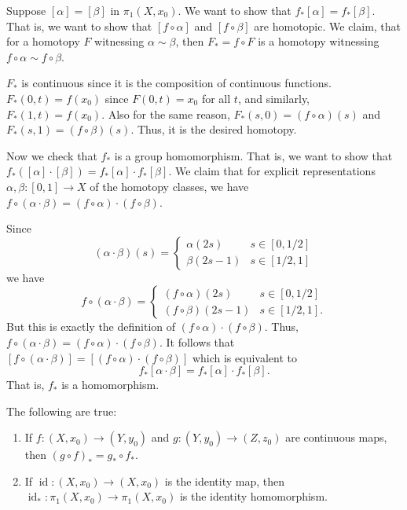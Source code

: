 \documentclass[12 pt, letterpaper]{hmcpset}
\begin{document}
\begin{solution}
	Suppose $[\alpha] = [\beta]$ in $\pi_{1}(X, x_{0})$. We want to show that $f_{*}[\alpha] = f_{*}[\beta]$. That is, we want to show that $[f \circ \alpha]$ and $[f \circ \beta]$ are homotopic. We claim, that for a homotopy $F$ witnessing $\alpha \sim \beta$, then $F_{*} = f \circ F$ is a homotopy witnessing $f \circ \alpha \sim f \circ \beta$.

	$F_{*}$ is continuous since it is the composition of continuous functions. $F_{*}(0, t) = f(x_{0})$ since $F(0, t) = x_{0}$ for all $t$, and similarly, $F_{*}(1, t) = f(x_{0})$. Also for the same reason, $F_{*}(s, 0) = (f \circ \alpha)(s)$ and $F_{*}(s, 1) = (f \circ \beta)(s)$. Thus, it is the desired homotopy.

	Now we check that $f_{*}$ is a group homomorphism. That is, we want to show that $f_{*}([\alpha] \cdot [\beta]) = f_{*}[\alpha] \cdot f_{*}[\beta]$. We claim that for explicit representations $\alpha, \beta : [0, 1] \to X$ of the homotopy classes, we have $f \circ (\alpha \cdot \beta) = (f \circ \alpha) \cdot (f \circ \beta)$.

	Since
	\[
		(\alpha \cdot \beta)(s) = \begin{cases}
			\alpha(2s) & s \in [0, 1/2] \\
			\beta(2s - 1) & s \in [1/2, 1]
		\end{cases}
	\]
	we have
	\[
		f \circ (\alpha \cdot \beta) = \begin{cases}
			(f \circ \alpha)(2s) & s \in [0, 1/2] \\
			(f \circ \beta)(2s - 1) & s \in [1/2, 1].
		\end{cases}
	\]
	But this is exactly the definition of $(f \circ \alpha) \cdot (f \circ \beta)$. Thus, $f \circ (\alpha \cdot \beta) = (f \circ \alpha) \cdot (f \circ \beta)$. It follows that $[f \circ (\alpha \cdot \beta)] = [(f \circ \alpha) \cdot (f \circ \beta)]$ which is equivalent to
	\[
		f_{*}[\alpha \cdot \beta] = f_{*}[\alpha] \cdot f_{*}[\beta].
	\]
	That is, $f_{*}$ is a homomorphism.
\end{solution}

\pagebreak

\begin{problem}[12.24]
	The following are true:
	\begin{enumerate}
		\item If $f : (X, x_{0}) \to (Y, y_{0})$ and $g : (Y, y_{0}) \to (Z, z_{0})$ are continuous maps, then $(g \circ f)_{*} = g_{*} \circ f_{*}$.
		\item If $\operatorname{id} : (X, x_{0}) \to (X, x_{0})$ is the identity map, then $ \operatorname{id}_{*} : \pi_{1}(X, x_{0}) \to \pi_{1}(X, x_{0})$ is the identity homomorphism.
	\end{enumerate}
\end{problem}
\end{document}
